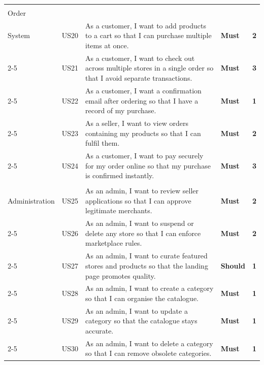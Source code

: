 \begin{longtable}{|>{\centering\arraybackslash\small}p{2.2cm}|>{\centering\arraybackslash\small}p{0.9cm}|>{\small}p{7.4cm}|>{\centering\arraybackslash\small}p{1.3cm}|>{\centering\arraybackslash\small}p{0.6cm}|}
  \cellcolor{featOrder}\makecell[c]{\textbf{F4}\\\small Order\\System}
  & US20 & As a customer, I want to add products to a cart so that I can purchase multiple items at once. & \cellcolor{moscowMust}\textbf{Must} & \cellcolor{complexMed}\textbf{2} \\\cline{2-5}
  \cellcolor{featOrder} & US21 & As a customer, I want to check out across multiple stores in a single order so that I avoid separate transactions. & \cellcolor{moscowMust}\textbf{Must} & \cellcolor{complexHigh}\textbf{3} \\\cline{2-5}
  \cellcolor{featOrder} & US22 & As a customer, I want a confirmation email after ordering so that I have a record of my purchase. & \cellcolor{moscowMust}\textbf{Must} & \cellcolor{complexLow}\textbf{1} \\\cline{2-5}
  \cellcolor{featOrder} & US23 & As a seller, I want to view orders containing my products so that I can fulfil them. & \cellcolor{moscowMust}\textbf{Must} & \cellcolor{complexMed}\textbf{2} \\\cline{2-5}
  \cellcolor{featOrder} & US24 & As a customer, I want to pay securely for my order online so that my purchase is confirmed instantly. & \cellcolor{moscowMust}\textbf{Must} & \cellcolor{complexHigh}\textbf{3} \\\hline

  \cellcolor{featAdmin}\makecell[c]{\textbf{F5}\\\small Administration}
  & US25 & As an admin, I want to review seller applications so that I can approve legitimate merchants. & \cellcolor{moscowMust}\textbf{Must} & \cellcolor{complexMed}\textbf{2} \\\cline{2-5}
  \cellcolor{featAdmin} & US26 & As an admin, I want to suspend or delete any store so that I can enforce marketplace rules. & \cellcolor{moscowMust}\textbf{Must} & \cellcolor{complexMed}\textbf{2} \\\cline{2-5}
  \cellcolor{featAdmin} & US27 & As an admin, I want to curate featured stores and products so that the landing page promotes quality. & \cellcolor{moscowShould}\textbf{Should} & \cellcolor{complexLow}\textbf{1} \\\cline{2-5}
  \cellcolor{featAdmin} & US28 & As an admin, I want to create a category so that I can organise the catalogue. & \cellcolor{moscowMust}\textbf{Must} & \cellcolor{complexLow}\textbf{1} \\\cline{2-5}
  \cellcolor{featAdmin} & US29 & As an admin, I want to update a category so that the catalogue stays accurate. & \cellcolor{moscowMust}\textbf{Must} & \cellcolor{complexLow}\textbf{1} \\\cline{2-5}
  \cellcolor{featAdmin} & US30 & As an admin, I want to delete a category so that I can remove obsolete categories. & \cellcolor{moscowMust}\textbf{Must} & \cellcolor{complexLow}\textbf{1} \\\hline


\end{longtable}
